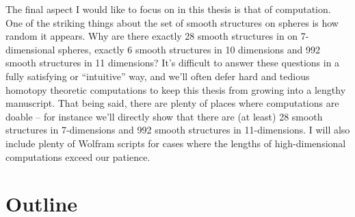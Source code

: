 The final aspect I would like to focus on in this thesis is that of computation.
One of the striking things about the set of smooth structures on spheres is how random it appears. Why are there exactly 28 smooth structures in on 7-dimensional spheres, exactly 6 smooth structures in 10 dimensions and 992 smooth structures in 11 dimensions? It's difficult to answer these questions in a fully satisfying or ``intuitive'' way, and we'll often defer hard and tedious homotopy theoretic computations to keep this thesis from growing into a lengthy manuscript. That being said, there are plenty of places where computations are doable -- for instance we'll directly show that there are (at least) 28 smooth structures in 7-dimensions and 992 smooth structures in 11-dimensions. I will also include plenty of Wolfram scripts for cases where the lengths of high-dimensional computations exceed our patience.

\section*{Outline}
